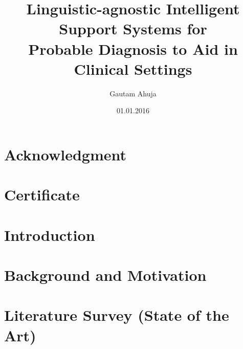 \documentclass[%
]{tumDiss}
\title{%
  Linguistic-agnostic Intelligent Support Systems for\\
   Probable Diagnosis to Aid in Clinical Settings\\
}
\author{Gautam Ahuja}
\date{01.01.2016}
\begin{document}
\frontmatter
\maketitle


\chapter{Acknowledgment}



\chapter{Certificate}



% 


\tableofcontents
\listoffigures
\listoftables
\printglossary[type=\acronymtype, nonumberlist]


\mainmatter
\chapter{Introduction}
\label{chap:introduction}



\chapter{Background and Motivation}
\label{chap:bcgmot}



\chapter{Literature Survey (State of the Art)}
\label{chap:sota}



\end{document}
